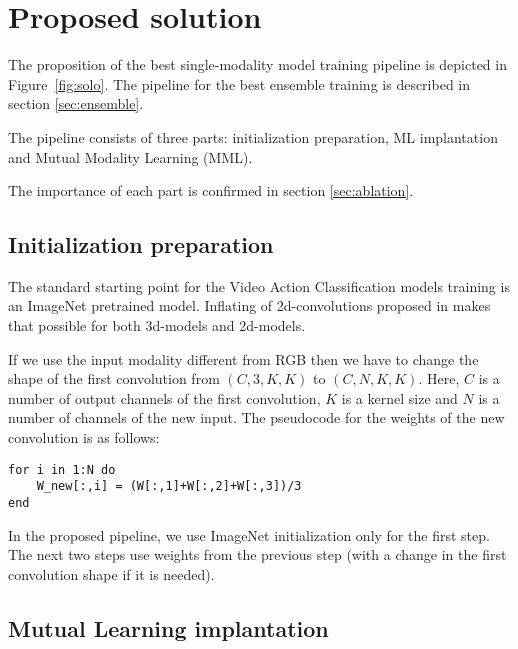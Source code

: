 \documentclass[conference]{IEEEtran}
\begin{document}
\section{Proposed solution}

The proposition of the best single-modality model training pipeline is depicted in Figure~\ref{fig:solo}. The pipeline for the best ensemble training is described in section \ref{sec:ensemble}.

The pipeline consists of three parts: initialization preparation, ML implantation and Mutual Modality Learning (MML).

The importance of each part is confirmed in section \ref{sec:ablation}.

\subsection{Initialization preparation}

The standard starting point for the Video Action Classification models training is an ImageNet \cite{deng2009imagenet} pretrained model. Inflating of 2d-convolutions proposed in \cite{carreira2017quo} makes that possible for both 3d-models and 2d-models.

If we use the input modality different from RGB then we have to change the shape of the first convolution from $(C,3,K,K)$ to $(C,N,K,K)$. Here, $C$ is a number of output channels of the first convolution, $K$ is a kernel size and $N$ is a number of channels of the new input. The pseudocode for the weights of the new convolution is as follows:

\begin{verbatim}
for i in 1:N do
    W_new[:,i] = (W[:,1]+W[:,2]+W[:,3])/3
end
\end{verbatim}

In the proposed pipeline, we use ImageNet initialization only for the first step. The next two steps use weights from the previous step (with a change in the first convolution shape if it is needed).

\subsection{Mutual Learning implantation}
\end{document}
